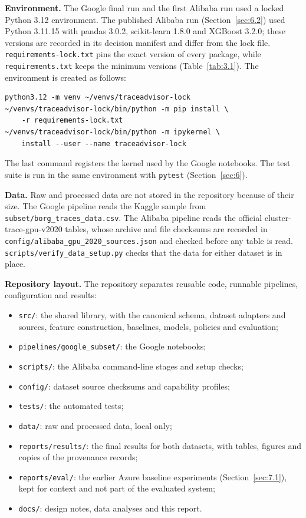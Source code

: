 \documentclass{IEEEtran}
\providecommand{\tightlist}{\setlength{\itemsep}{0pt}\setlength{\parskip}{0pt}}
\begin{document}
\textbf{Environment.} The Google final run and the first Alibaba run used a locked Python 3.12 environment. The published Alibaba run (Section~\ref{sec:6.2}) used Python 3.11.15 with pandas 3.0.2, scikit-learn 1.8.0 and XGBoost 3.2.0; these versions are recorded in its decision manifest and differ from the lock file. \texttt{requirements-lock.txt} pins the exact version of every package, while \texttt{requirements.txt} keeps the minimum versions (Table~\ref{tab:3.1}). The environment is created as follows:

{\footnotesize
\begin{verbatim}
python3.12 -m venv ~/venvs/traceadvisor-lock
~/venvs/traceadvisor-lock/bin/python -m pip install \
    -r requirements-lock.txt
~/venvs/traceadvisor-lock/bin/python -m ipykernel \
    install --user --name traceadvisor-lock
\end{verbatim}
}

The last command registers the kernel used by the Google notebooks. The test suite is run in the same environment with \texttt{pytest} (Section~\ref{sec:6}).

\textbf{Data.} Raw and processed data are not stored in the repository because of their size. The Google pipeline reads the Kaggle sample from \texttt{subset/borg\_traces\_data.csv}. The Alibaba pipeline reads the official cluster-trace-gpu-v2020 tables, whose archive and file checksums are recorded in \texttt{config/alibaba\_gpu\_2020\_sources.json} and checked before any table is read. \texttt{scripts/verify\_data\_setup.py} checks that the data for either dataset is in place.

\textbf{Repository layout.} The repository separates reusable code, runnable pipelines, configuration and results:

\begin{itemize}
\tightlist
\item
  \texttt{src/}: the shared library, with the canonical schema, dataset adapters and sources, feature construction, baselines, models, policies and evaluation;
\item
  \texttt{pipelines/google\_subset/}: the Google notebooks;
\item
  \texttt{scripts/}: the Alibaba command-line stages and setup checks;
\item
  \texttt{config/}: dataset source checksums and capability profiles;
\item
  \texttt{tests/}: the automated tests;
\item
  \texttt{data/}: raw and processed data, local only;
\item
  \texttt{reports/results/}: the final results for both datasets, with tables, figures and copies of the provenance records;
\item
  \texttt{reports/eval/}: the earlier Azure baseline experiments (Section~\ref{sec:7.1}), kept for context and not part of the evaluated system;
\item
  \texttt{docs/}: design notes, data analyses and this report.
\end{itemize}
\end{document}
